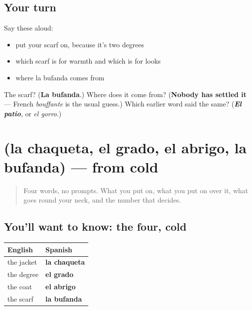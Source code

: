 \subsection*{Your turn}
Say these aloud:

\begin{itemize}
\raggedright
  \item put your scarf on, because it's two degrees
  \item which scarf is for warmth and which is for looks
  \item where la bufanda comes from
\end{itemize}

\begin{tcolorbox}[breakable,colback=teal!4,colframe=teal!35!black,title={Before you move on}]
The scarf? (\textbf{La bufanda}.) Where does it come from? (\textbf{Nobody has settled it} — French \emph{bouffante} is the usual guess.) Which earlier word said the same? (\emph{\textbf{El patio}}, or \emph{el gorro}.)
\end{tcolorbox}
\section[(la chaqueta, el grado, el abrigo, la …]{(la chaqueta, el grado, el abrigo, la bufanda) — from cold}

\label{lesson:ES-R468-repaso-abrigo}



\begin{quote}
Four words, no prompts. What you put on, what you put on over it, what goes round your neck, and the number that decides.
\end{quote}

\subsection*{You'll want to know: the four, cold}
\noindent
\begin{tabularx}{\linewidth}{@{}>{\raggedright\arraybackslash}X>{\raggedright\arraybackslash}X@{}}
\toprule
\textbf{English} & \textbf{Spanish} \\
\midrule
the jacket & \textbf{la chaqueta} \\
the degree & \textbf{el grado} \\
the coat & \textbf{el abrigo} \\
the scarf & \textbf{la bufanda} \\
\bottomrule
\end{tabularx}

